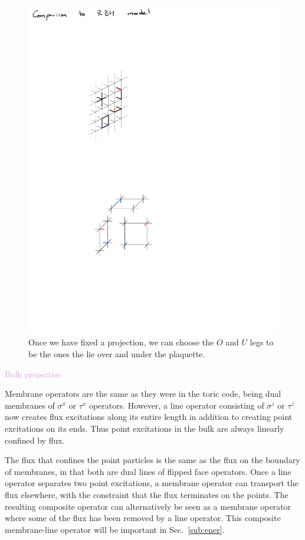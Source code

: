 \documentclass[twocolumn, longbibliography]{revtex4-2}
\newcommand{\outline}[1]{\textcolor{Plum}{#1}}
\begin{document}
\begin{figure}
\centering
\includegraphics[width=\linewidth]{legs}
\caption{Once we have fixed a projection, we can choose the $O$ and $U$ legs to be the ones the lie over and under the plaquette. }
\label{fig:legs}
\end{figure}
	
\outline{Bulk properties}
	
Membrane operators are the same as they were in the toric code, being dual membranes of $\sigma^x$ or $\tau^x$ operators. However, a line operator consisting of $\sigma^z$ or $\tau^z$ now creates flux excitations along its entire length in addition to creating point excitations on its ends. Thus point excitations in the bulk are always linearly confined by flux.
	
The flux that confines the point particles is the same as the flux on the boundary of membranes, in that both are dual lines of flipped face operators. Once a line operator separates two point excitations, a membrane operator can transport the flux elsewhere, with the constraint that the flux terminates on the points. The resulting composite operator can alternatively be seen as a membrane operator where some of the flux has been removed by a line operator. This composite membrane-line operator will be important in Sec.~\ref{sub:ener}.
	
\end{document}
